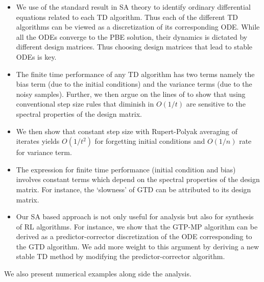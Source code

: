 \begin{itemize}[leftmargin=*] 
\item We use of the standard result in SA theory to identify ordinary differential equations related to each TD algorithm. Thus each of the different TD algorithms can be viewed as a discretization of its corresponding ODE. While all the ODEs converge to the PBE solution, their dynamics is dictated by different design matrices. Thus choosing design matrices that lead to stable ODEs is key.
\item The finite time performance of any TD algorithm has two terms namely the bias term (due to the initial conditions) and the variance terms (due to the noisy samples). Further, we then argue on the lines of \cite{} to show that using conventional step size rules that diminish in $O(1/t)$ are sensitive to the spectral properties of the design matrix.
\item We then show that constant step size with Rupert-Polyak averaging of iterates yields $O(1/t^2)$ for forgetting initial conditions and $O(1/n)$ rate for variance term.
\item The expression for finite time performance (initial condition and bias) involves constant terms which depend on the spectral properties of the design matrix. For instance, the `slowness’ of GTD can be attributed to its design matrix.
\item Our SA based approach is not only useful for analysis but also for synthesis of RL algorithms. For instance, we show that the GTP-MP algorithm can be derived as a predictor-corrector discretization of the ODE corresponding to the GTD algorithm. We add more weight to this argument by deriving a new stable TD method by modifying the predictor-corrector algorithm.
\end{itemize}
We also present numerical examples along side the analysis.
